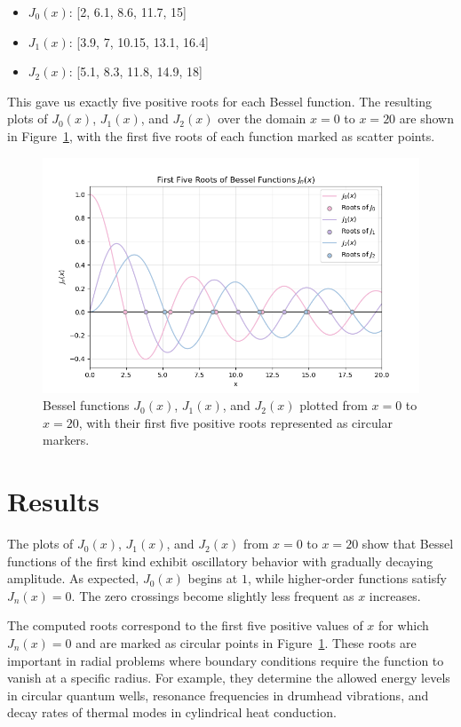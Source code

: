 \documentclass[linenumbers, twocolumn]{aastex631}
\begin{document}
\begin{itemize}
    \item $J_0(x)$: [2, 6.1, 8.6, 11.7, 15]
    \item $J_1(x)$: [3.9, 7, 10.15, 13.1, 16.4]
    \item $J_2(x)$: [5.1, 8.3, 11.8, 14.9, 18]
\end{itemize}

\noindent This gave us exactly five positive roots for each Bessel function. The 
resulting plots of $J_0(x)$, $J_1(x)$, and $J_2(x)$ over the domain $x=0$ to
$x=20$ are shown in Figure~\ref{fig:bessel_roots}, with the first five roots of
each function marked as scatter points.

\begin{figure}[H]
    \centering
    \includegraphics[width=1.0\linewidth]{bessel_roots.png}
    \caption{Bessel functions $J_0(x)$, $J_1(x)$, and $J_2(x)$ plotted from $x=0$ to
    $x=20$, with their first five positive roots represented as circular markers.}
    \label{fig:bessel_roots}
\end{figure}


\section{Results} \label{sec:results}

The plots of $J_0(x)$, $J_1(x)$, and $J_2(x)$ from $x=0$ to $x=20$ show that
Bessel functions of the first kind exhibit oscillatory behavior with gradually
decaying amplitude. As expected, $J_0(x)$ begins at $1$, while higher-order
functions satisfy $J_n(x)=0$. The zero crossings become slightly less
frequent as $x$ increases.

\noindent The computed roots correspond to the first five positive values of $x$
for which $J_n(x)=0$ and are marked as circular points in Figure~\ref{fig:bessel_roots}.
These roots are important in radial problems where boundary conditions require the
function to vanish at a specific radius. For example, they determine the allowed
energy levels in circular quantum wells, resonance frequencies in drumhead 
vibrations, and decay rates of thermal modes in cylindrical heat conduction.
\end{document}
